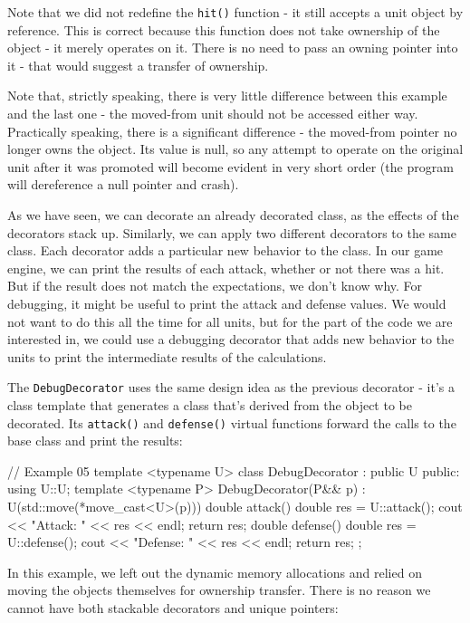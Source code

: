 Note that we did not redefine the \texttt{hit()} function - it still accepts a unit object by reference. This is correct because this function does not take ownership of the object - it merely operates on it. There is no need to pass an owning pointer into it - that would suggest a transfer of ownership.

Note that, strictly speaking, there is very little difference between this example and the last one - the moved-from unit should not be accessed either way. Practically speaking, there is a significant difference - the moved-from pointer no longer owns the object. Its value is null, so any attempt to operate on the original unit after it was promoted will become evident in very short order (the program will dereference a null pointer and crash).

As we have seen, we can decorate an already decorated class, as the effects of the decorators stack up. Similarly, we can apply two different decorators to the same class. Each decorator adds a particular new behavior to the class. In our game engine, we can print the results of each attack, whether or not there was a hit. But if the result does not match the expectations, we don't know why. For debugging, it might be useful to print the attack and defense values. We would not want to do this all the time for all units, but for the part of the code we are interested in, we could use a debugging decorator that adds new behavior to the units to print the intermediate results of the calculations.

The \texttt{DebugDecorator} uses the same design idea as the previous decorator - it's a class template that generates a class that's derived from the object to be decorated. Its \texttt{attack()} and \texttt{defense()} virtual functions forward the calls to the base class and print the results:

\begin{code}
// Example 05
template <typename U> class DebugDecorator : public U {
  public:
  using U::U;
  template <typename P> DebugDecorator(P&& p) :
    U(std::move(*move_cast<U>(p))) {}
  double attack() {
    double res = U::attack();
    cout << "Attack: " << res << endl;
    return res;
  }
  double defense() {
    double res = U::defense();
    cout << "Defense: " << res << endl;
    return res;
  }
};
\end{code}

In this example, we left out the dynamic memory allocations and relied on moving the objects themselves for ownership transfer. There is no reason we cannot have both stackable decorators and unique pointers:

